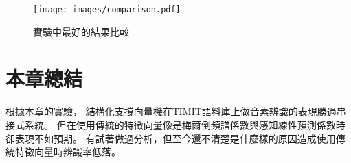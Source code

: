     \newpage

    \begin{figure}
      \begin{center}
	\texttt{[image: images/comparison.pdf]}
      \end{center}
      \caption{實驗中最好的結果比較}
      \label{fig:comparison}
    \end{figure}

\section{本章總結}
  根據本章的實驗，
  結構化支撐向量機在TIMIT語料庫上做音素辨識的表現勝過串接式系統。
  但在使用傳統的特徵向量像是梅爾倒頻譜係數與感知線性預測係數時卻表現不如預期。
  有試著做過分析，但至今還不清楚是什麼樣的原因造成使用傳統特徵向量時辨識率低落。
